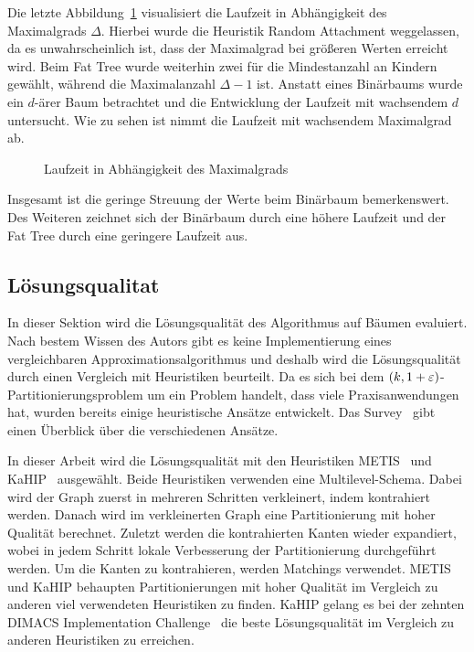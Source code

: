 Die letzte Abbildung~\ref{fig:rundeg} visualisiert die Laufzeit in Abhängigkeit des Maximalgrads $\Delta$.
Hierbei wurde die Heuristik Random Attachment weggelassen, da es unwahrscheinlich ist, dass der Maximalgrad bei größeren Werten erreicht wird.
Beim Fat Tree wurde weiterhin zwei für die Mindestanzahl an Kindern gewählt, während die Maximalanzahl $\Delta - 1$ ist.
Anstatt eines Binärbaums wurde ein $d$\hyp ärer Baum betrachtet und die Entwicklung der Laufzeit mit wachsendem $d$ untersucht.
Wie zu sehen ist nimmt die Laufzeit mit wachsendem Maximalgrad ab.

\begin{figure}[H]
    \centering
    
    \caption{Laufzeit in Abhängigkeit des Maximalgrads\label{fig:rundeg}}
\end{figure}

Insgesamt ist die geringe Streuung der Werte beim Binärbaum bemerkenswert.
Des Weiteren zeichnet sich der Binärbaum durch eine höhere Laufzeit und der Fat Tree durch eine geringere Laufzeit aus.

\subsection{Lösungsqualitat}
In dieser Sektion wird die Lösungsqualität des Algorithmus auf Bäumen evaluiert.
Nach bestem Wissen des Autors gibt es keine Implementierung eines vergleichbaren Approximationsalgorithmus und deshalb wird die Lösungsqualität durch einen Vergleich mit Heuristiken beurteilt.
Da es sich bei dem $(k,1+\varepsilon)$\hyp Partitionierungsproblem um ein Problem handelt, dass viele Praxisanwendungen hat, wurden bereits einige heuristische Ansätze entwickelt. 
Das Survey~\cite{BMS+16} gibt einen Überblick über die verschiedenen Ansätze.

In dieser Arbeit wird die Lösungsqualität mit den Heuristiken METIS~\cite{KK98} und KaHIP~\cite{SS13} ausgewählt.
Beide Heuristiken verwenden eine Multilevel-Schema.
Dabei wird der Graph zuerst in mehreren Schritten verkleinert, indem kontrahiert werden.
Danach wird im verkleinerten Graph eine Partitionierung mit hoher Qualität berechnet.
Zuletzt werden die kontrahierten Kanten wieder expandiert, wobei in jedem Schritt lokale Verbesserung der Partitionierung durchgeführt werden.
Um die Kanten zu kontrahieren, werden Matchings verwendet.
METIS und KaHIP behaupten Partitionierungen mit hoher Qualität im Vergleich zu anderen viel verwendeten Heuristiken zu finden.
KaHIP gelang es bei der zehnten DIMACS Implementation Challenge~\cite{BMS+13} die beste Lösungsqualität im Vergleich zu anderen Heuristiken zu erreichen.

